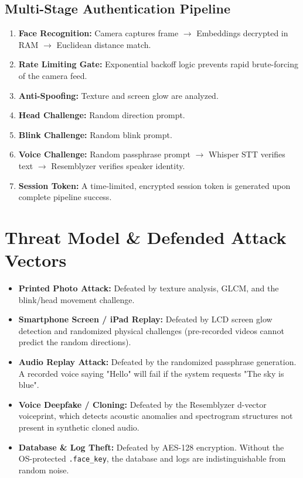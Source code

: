 \documentclass[12pt,a4paper]{article}
\begin{document}
\subsection{Multi-Stage Authentication Pipeline}
\begin{enumerate}
    \item \textbf{Face Recognition:} Camera captures frame $\rightarrow$ Embeddings decrypted in RAM $\rightarrow$ Euclidean distance match.
    \item \textbf{Rate Limiting Gate:} Exponential backoff logic prevents rapid brute-forcing of the camera feed.
    \item \textbf{Anti-Spoofing:} Texture and screen glow are analyzed.
    \item \textbf{Head Challenge:} Random direction prompt.
    \item \textbf{Blink Challenge:} Random blink prompt.
    \item \textbf{Voice Challenge:} Random passphrase prompt $\rightarrow$ Whisper STT verifies text $\rightarrow$ Resemblyzer verifies speaker identity.
    \item \textbf{Session Token:} A time-limited, encrypted session token is generated upon complete pipeline success.
\end{enumerate}

\section{Threat Model \& Defended Attack Vectors}
\begin{itemize}
    \item \textbf{Printed Photo Attack:} Defeated by texture analysis, GLCM, and the blink/head movement challenge.
    \item \textbf{Smartphone Screen / iPad Replay:} Defeated by LCD screen glow detection and randomized physical challenges (pre-recorded videos cannot predict the random directions).
    \item \textbf{Audio Replay Attack:} Defeated by the randomized passphrase generation. A recorded voice saying "Hello" will fail if the system requests "The sky is blue".
    \item \textbf{Voice Deepfake / Cloning:} Defeated by the Resemblyzer d-vector voiceprint, which detects acoustic anomalies and spectrogram structures not present in synthetic cloned audio.
    \item \textbf{Database \& Log Theft:} Defeated by AES-128 encryption. Without the OS-protected \texttt{.face\_key}, the database and logs are indistinguishable from random noise.
\end{itemize}
\end{document}
